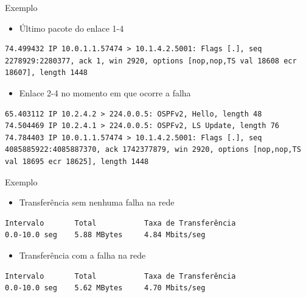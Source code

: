 \documentclass{beamer}
\newlength{\wideitemsep}
\let\olditem\item
\renewcommand{\item}{\setlength{\itemsep}{\wideitemsep}\olditem}
\begin{document}
\begin{frame}[fragile]{Exemplo}
\begin{itemize}
 \item Último pacote do enlace 1-4 %
\end{itemize}
\begin{lstlisting}
74.499432 IP 10.0.1.1.57474 > 10.1.4.2.5001: Flags [.], seq 2278929:2280377, ack 1, win 2920, options [nop,nop,TS val 18608 ecr 18607], length 1448
\end{lstlisting}

\begin{itemize}
 \item Enlace 2-4 no momento em que ocorre a falha %
\end{itemize}

\begin{lstlisting}
65.403112 IP 10.2.4.2 > 224.0.0.5: OSPFv2, Hello, length 48
74.504469 IP 10.2.4.1 > 224.0.0.5: OSPFv2, LS Update, length 76
74.784403 IP 10.0.1.1.57474 > 10.1.4.2.5001: Flags [.], seq 4085885922:4085887370, ack 1742377879, win 2920, options [nop,nop,TS val 18695 ecr 18625], length 1448
\end{lstlisting}
\end{frame}

\begin{frame}[fragile]{Exemplo}
\begin{itemize}
 \item Transferência sem nenhuma falha na rede %
\end{itemize}
\begin{lstlisting}
Intervalo       Total           Taxa de Transferência
0.0-10.0 seg    5.88 MBytes     4.84 Mbits/seg
\end{lstlisting}

\begin{itemize}
 \item Transferência com a falha na rede %
\end{itemize}
\begin{lstlisting}
Intervalo       Total           Taxa de Transferência
0.0-10.0 seg    5.62 MBytes     4.70 Mbits/seg
\end{lstlisting}
\end{frame}
\end{document}
